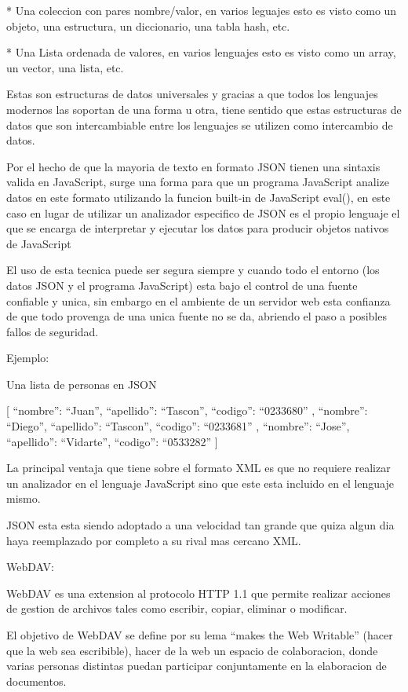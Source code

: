 * Una coleccion con pares nombre/valor, en varios leguajes esto es visto como un objeto, una estructura, un diccionario, una tabla hash, etc.

* Una Lista ordenada de valores, en varios lenguajes esto es visto como un array, un vector, una lista, etc.

Estas son estructuras de datos universales y gracias a que todos los lenguajes modernos las soportan de una forma u otra, tiene sentido que estas estructuras de datos que son intercambiable entre los lenguajes se utilizen como intercambio de datos.

Por el hecho de que la mayoria de texto en formato JSON tienen una sintaxis valida en JavaScript, surge una forma para que un programa JavaScript analize datos en este formato utilizando la funcion built-in de JavaScript eval(), en este caso en lugar de utilizar un analizador especifico de JSON es el propio lenguaje el que se encarga de interpretar y ejecutar los datos para producir objetos nativos de JavaScript 

El uso de esta tecnica puede ser segura siempre y cuando todo el entorno (los datos JSON y el programa JavaScript) esta bajo el control de una fuente confiable y unica, sin embargo en el ambiente de un servidor web esta confianza de que todo provenga de una unica fuente no se da, abriendo el paso a posibles fallos de seguridad.


Ejemplo:

Una lista de personas en JSON

[
 { ``nombre'': ``Juan'', ``apellido'': ``Tascon'', ``codigo'': ``0233680'' },
 { ``nombre'': ``Diego'', ``apellido'': ``Tascon'', ``codigo'': ``0233681'' },
 { ``nombre'': ``Jose'', ``apellido'': ``Vidarte'', ``codigo'': ``0533282'' }
]

La principal ventaja que tiene sobre el formato XML es que no requiere realizar un analizador en el lenguaje JavaScript sino que este esta incluido en el lenguaje mismo.

JSON esta esta siendo adoptado a una velocidad tan grande que quiza algun dia haya reemplazado por completo a su rival mas cercano XML.



WebDAV:

WebDAV es una extension al protocolo HTTP 1.1 que permite realizar acciones de gestion de archivos tales como escribir, copiar, eliminar o modificar.

El objetivo de WebDAV se define por su lema ``makes the Web Writable'' (hacer que la web sea escribible), hacer de la web un espacio de colaboracion, donde varias personas distintas puedan participar conjuntamente en la elaboracion de documentos.

